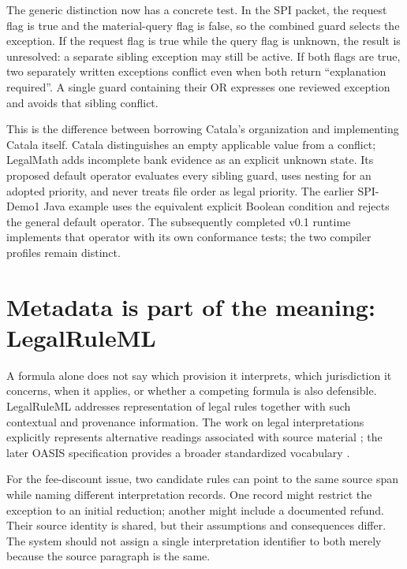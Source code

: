 
The generic distinction now has a concrete test. In the SPI packet, the request
flag is true and the material-query flag is false, so the combined guard selects
the exception. If the request flag is true while the query flag is unknown, the
result is unresolved: a separate sibling exception may still be active. If both
flags are true, two separately written exceptions conflict even when both return
``explanation required''. A single guard containing their OR expresses one
reviewed exception and avoids that sibling conflict.

This is the difference between borrowing Catala's organization and implementing
Catala itself. Catala distinguishes an empty applicable value from a conflict;
LegalMath adds incomplete bank evidence as an explicit unknown state. Its
proposed default operator evaluates every sibling guard, uses nesting for an
adopted priority, and never treats file order as legal priority. The earlier
SPI-Demo1 Java example uses the equivalent explicit Boolean condition and rejects
the general default operator. The subsequently completed v0.1 runtime implements
that operator with its own conformance tests; the two compiler profiles remain
distinct.

\section{Metadata is part of the meaning: LegalRuleML}
\label{merge:M04:04}

\label{sec:languages-legalruleml}
A formula alone does not say which provision it interprets, which jurisdiction
it concerns, when it applies, or whether a competing formula is also
defensible. LegalRuleML addresses representation of legal rules together with
such contextual and provenance information. The work on legal interpretations
explicitly represents alternative readings associated with source material
\citep[secs.~2--4]{legalinterpretations2014}; the later OASIS specification
provides a broader standardized vocabulary \citep{legalruleml2021}.

For the fee-discount issue, two candidate rules can point to the same source
span while naming different interpretation records. One record might restrict
the exception to an initial reduction; another might include a documented
refund. Their source identity is shared, but their assumptions and consequences
differ. The system should not assign a single interpretation identifier to
both merely because the source paragraph is the same.

